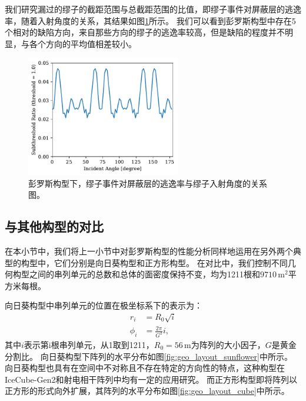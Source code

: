 我们研究漏过的缪子的截距范围与总截距范围的比值，即缪子事件对屏蔽层的逃逸率，随着入射角度的关系，其结果如图\ref{fig:corridor_angle_penrose}所示。
我们可以看到彭罗斯构型中存在5个相对的缺陷方向，来自那些方向的缪子的逃逸率较高，但是缺陷的程度并不明显，与各个方向的平均值相差较小。

\begin{figure}[!htb]%
    \centering
    \includegraphics[width=0.60\textwidth]{img/corridor_angle_penrose.pdf}
    \caption{彭罗斯构型下，缪子事件对屏蔽层的逃逸率与缪子入射角度的关系图。}
    \label{fig:corridor_angle_penrose}
\end{figure}

\subsection{与其他构型的对比}

在本小节中，我们将上一小节中对彭罗斯构型的性能分析同样地运用在另外两个典型的构型中，它们分别是向日葵构型和正方形构型。
在对比中，我们控制不同几何构型之间的串列单元的总数和总体的面密度保持不变，均为1211根和$9710\,\mathrm{m^2}$平方米每根。

向日葵构型中串列单元的位置在极坐标系下的表示为：
\begin{equation}
\begin{aligned}
    r_i &= R_0 \sqrt{i} \\
    \phi_i &= \frac{2\pi}{G^2} i ,
\end{aligned}
\end{equation}
其中$i$表示第i根串列单元，从1取到1211，$R_0 = 56\,\mathrm{m}$为阵列的大小因子，$G$是黄金分割比。
向日葵构型下阵列的水平分布如图\ref{fig:geo_layout_sunflower}中所示。
向日葵构型也具有在空间中不对称且不存在特定的方向性的特点，这种构型在IceCube-Gen2\cite{IceCube-Gen2_white_paper:2020}和射电相干阵列\cite{vigano_sunflower:2009}中均有一定的应用研究。
而正方形构型即将阵列以正方形的形式向外扩展，其阵列的水平分布如图\ref{fig:geo_layout_cube}中所示。


